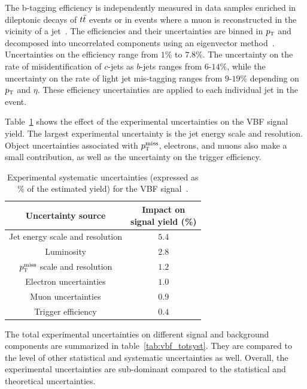 The b-tagging efficiency is independently measured in data samples enriched in dileptonic decays of $t\bar{t}$ events or in events where a muon is reconstructed in the vicinity of a jet~\cite{btag-calib,btag-muons}. The efficiencies and their uncertainties are binned in $p_{\textrm{\footnotesize\sc t}}$ and decomposed into uncorrelated components using an eigenvector method~\cite{BtagCalib1}. Uncertainties on the efficiency range from $1\%$ to $7.8\%$. The uncertainty on the rate of misidentification of $c$-jets as $b$-jets ranges from $6$-$14$\%, while the uncertainty on the rate of light jet mis-tagging ranges from $9$-$19\%$ depending on $p_{\textrm{\footnotesize\sc t}}$ and $\eta$. These efficiency uncertainties are applied to each individual jet in the event. 

Table~\ref{tab:vbf_exptsys} shows the effect of the experimental uncertainties on the VBF signal yield. The largest experimental uncertainty is the jet energy scale and resolution. Object uncertainties associated with $p_{\textrm{\footnotesize\sc t}}^{\rm miss}$, electrons, and muons also make a small contribution, as well as the uncertainty on the trigger efficiency.

\begin{table}[h!]
\centering
\captionsetup{justification=centering}
\begin{tabular}{|c|c|}
\hline
Uncertainty source & \specialcell{Impact on \\signal yield (\%)}  \\ \hline
Jet energy scale and resolution & $5.4$ \\ \hline
Luminosity & $2.8$ \\ \hline
$p_{\textrm{\footnotesize\sc t}}^{\rm miss}$ scale and resolution & $1.2$ \\ \hline
Electron uncertainties & $1.0$ \\ \hline
Muon uncertainties & $0.9$ \\ \hline
Trigger efficiency & $0.4$ \\ \hline
\end{tabular}
\caption{Experimental systematic uncertainties (expressed as \% of the estimated yield) for the VBF signal~\cite{WW2015}.}
\label{tab:vbf_exptsys}
\end{table}

The total experimental uncertainties on different signal and background components are summarized in table~\ref{tab:vbf_totsyst}. They are compared to the level of other statistical and systematic uncertainties as well. Overall, the experimental uncertainties are sub-dominant compared to the statistical and theoretical uncertainties.

